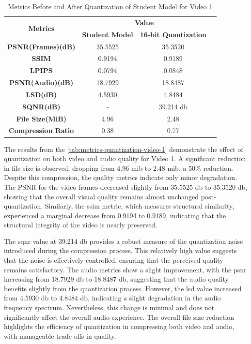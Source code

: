 \documentclass{ioereport}
\begin{document}
    \begin{table}[H]
        \centering
        \caption{Metrics Before and After Quantization of Student Model for Video 1}
        \label{tab:metrics-quantization-video-1}
        \begin{tabular}{|c|c|c|c|}
            \hline
            \multirow{2}{*}{\textbf{Metrics}} & \multicolumn{2}{c|}{\textbf{Value}} \\ \cline{2-3}
            & \textbf{Student Model} & \textbf{16-bit Quantization} \\ \hline
            \textbf{PSNR(Frames)(dB)} & 35.5525 & 35.3520 \\ \hline
            \textbf{SSIM} & 0.9194 & 0.9189 \\ \hline
            \textbf{LPIPS} & 0.0794 & 0.0848\\ \hline
            \textbf{PSNR(Audio)(dB)} & 18.7929 & 18.8487  \\ \hline
            \textbf{LSD(dB)} & 4.5930 & 4.8484 \\ \hline
            \textbf{SQNR(dB)} & - & 39.214 \gls{db} \\ \hline
            \textbf{File Size(MiB)} & 4.96 & 2.48 \\ \hline
            \textbf{Compression Ratio} & 0.38 & 0.77 \\ \hline
        \end{tabular}
    \end{table}

    The results from the \autoref{tab:metrics-quantization-video-1} demonstrate the effect of quantization on both video and audio quality for Video 1. A significant reduction in file size is observed, dropping from 4.96 \gls{mib} to 2.48 \gls{mib}, a 50\% reduction. Despite this compression, the quality metrics indicate only minor degradation. The PSNR for the video frames decreased slightly from 35.5525 \gls{db} to 35.3520 \gls{db}, showing that the overall visual quality remains almost unchanged post-quantization. Similarly, the \gls{ssim} metric, which measures structural similarity, experienced a marginal decrease from 0.9194 to 0.9189, indicating that the structural integrity of the video is nearly preserved.

    The \gls{sqnr} value at 39.214 \gls{db} provides a robust measure of the quantization noise introduced during the compression process. This relatively high value suggests that the noise is effectively controlled, ensuring that the perceived quality remains satisfactory. The audio metrics show a slight improvement, with the \gls{psnr} increasing from 18.7929 \gls{db} to 18.8487 \gls{db}, suggesting that the audio quality benefits slightly from the quantization process. However, the \gls{lsd} value increased from 4.5930 \gls{db} to 4.8484 \gls{db}, indicating a slight degradation in the audio frequency spectrum. Nevertheless, this change is minimal and does not significantly affect the overall audio experience. The overall file size reduction highlights the efficiency of quantization in compressing both video and audio, with manageable trade-offs in quality.
\end{document}
